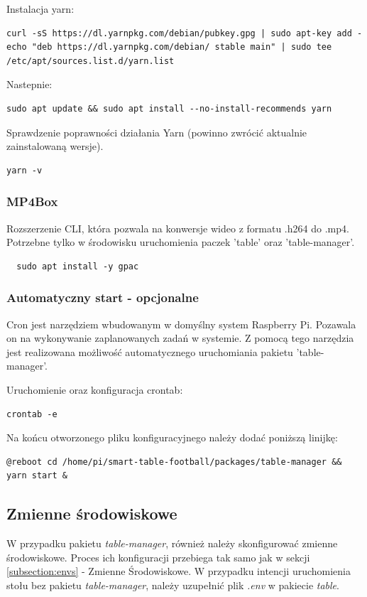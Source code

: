 Instalacja yarn:
\begin{lstlisting}[breaklines=true]
curl -sS https://dl.yarnpkg.com/debian/pubkey.gpg | sudo apt-key add -echo "deb https://dl.yarnpkg.com/debian/ stable main" | sudo tee /etc/apt/sources.list.d/yarn.list
\end{lstlisting}

Nastepnie:
\begin{lstlisting}[breaklines=true]
sudo apt update && sudo apt install --no-install-recommends yarn
\end{lstlisting}

Sprawdzenie poprawności działania Yarn (powinno zwrócić aktualnie zainstalowaną wersje).
\begin{lstlisting}
yarn -v
\end{lstlisting}


\subsubsection{MP4Box}
Rozszerzenie CLI, która pozwala na konwersje wideo z formatu .h264 do .mp4. Potrzebne tylko w środowisku uruchomienia paczek 'table' oraz 'table-manager'.

\begin{lstlisting}
  sudo apt install -y gpac
\end{lstlisting}


\subsubsection{Automatyczny start - opcjonalne}
Cron jest narzędziem wbudowanym w domyślny system Raspberry Pi. Pozawala on na wykonywanie zaplanowanych zadań w systemie. Z pomocą tego narzędzia jest realizowana możliwość automatycznego uruchomiania pakietu 'table-manager'. \cite{RaspCronDocs}

Uruchomienie oraz konfiguracja crontab:
\begin{lstlisting}
crontab -e
\end{lstlisting}

Na końcu otworzonego pliku konfiguracyjnego należy dodać poniższą linijkę:
\begin{lstlisting}[breaklines=true]
@reboot cd /home/pi/smart-table-football/packages/table-manager && yarn start &
\end{lstlisting}

\subsection{Zmienne środowiskowe}
W przypadku pakietu \textit{table-manager}, również należy skonfigurować zmienne środowiskowe. Proces ich konfiguracji przebiega tak samo jak w sekcji \ref{subsection:envs} - Zmienne Środowiskowe. W przypadku intencji uruchomienia stołu bez pakietu \textit{table-manager}, należy uzupełnić plik \textit{.env} w pakiecie \textit{table}.

